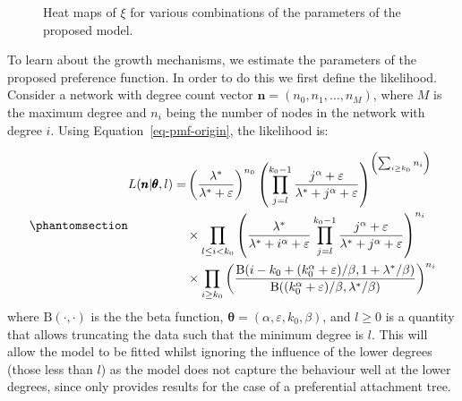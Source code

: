 \documentclass[
  sn-basic,
  10pt,
]{sn-jnl}
\theoremstyle{thmstyleone}
\theoremstyle{thmstyleone}
\theoremstyle{remark}
\theoremstyle{plain}
\theoremstyle{plain}
\theoremstyle{remark}
\begin{document}
\begin{figure}


\caption{\label{fig-polyheat}Heat maps of \(\xi\) for various
combinations of the parameters of the proposed model.}

\end{figure}%

\newpage

To learn about the growth mechanisms, we estimate the parameters of the
proposed preference function. In order to do this we first define the
likelihood. Consider a network with degree count vector
\(\pmb n = (n_0, n_1, \ldots, n_M)\), where \(M\) is the maximum degree
and \(n_i\) being the number of nodes in the network with degree \(i\).
Using Equation~\ref{eq-pmf-origin}, the likelihood is:

\begin{equation}\phantomsection\label{eq-llh}{
\begin{aligned}
L(\pmb n | \pmb \theta,l) = &\left(\frac{\lambda^*}{\lambda^*+\varepsilon}\right)^{n_0}\left(\prod_{j=l}^{k_0-1}\frac{j^\alpha +\varepsilon}{\lambda^* + j^\alpha +\varepsilon}\right)^{\left(\sum_{i\ge k_0}n_{i}\right)} \\ &\times \prod_{l \le i<k_0}\left(\frac{\lambda^*}{\lambda^* +i^\alpha + \varepsilon } \prod_{j=l}^{k_0-1}\frac{j^\alpha + \varepsilon}{\lambda^* + j^\alpha + \varepsilon}\right)^{n_i}\\ &\times \prod_{i\ge k_0}\left(\frac{\text{B}(i-k_0 + (k_0^\alpha + \varepsilon)/\beta,1+\lambda^*/\beta)}{\text{B}((k_0^\alpha + \varepsilon)/\beta,\lambda^*/\beta)}\right)^{n_i}
\end{aligned}
}\end{equation} where \(\text{B}(\cdot,\cdot)\) is the the beta
function, \(\pmb \theta = (\alpha, \varepsilon, k_0,\beta)\), and
\(l\ge0\) is a quantity that allows truncating the data such that the
minimum degree is \(l\). This will allow the model to be fitted whilst
ignoring the influence of the lower degrees (those less than \(l\)) as
the model does not capture the behaviour well at the lower degrees,
since \citet{rudas07} only provides results for the case of a
preferential attachment tree.
\end{document}
